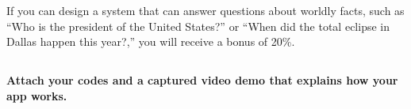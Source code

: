 \documentclass{article}
\begin{document}
If you can design a system that can answer questions about worldly facts, 
such as ``Who is the president of the United States?'' or ``When did the total eclipse in Dallas happen this year?,'' you will receive a bonus of 20\%.

\subsection*{}
\textbf{Attach your codes and a captured video demo that explains how your app works.}
\end{document}
